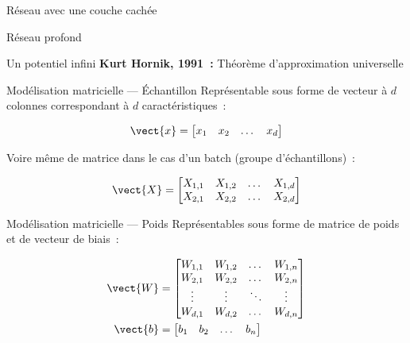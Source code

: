\begin{frame}{Réseau avec une couche cachée}
  \centering
\end{frame}

\begin{frame}{Réseau profond}
  \centering
\end{frame}

\begin{frame}{Un potentiel infini}
  \textbf{Kurt Hornik, 1991~:} Théorème d'approximation universelle
\end{frame}

\begin{frame}{Modélisation matricielle --- Échantillon}
  Représentable sous forme de vecteur à $d$ colonnes correspondant à $d$ caractéristiques~:

  \[
    \vect{x} = \begin{bmatrix}
      x_1 & x_2 & \dots & x_d
    \end{bmatrix}
  \]

  Voire même de matrice dans le cas d'un batch (groupe d'échantillons)~:

  \[
    \vect{X} = \begin{bmatrix}
      X_{1,1} & X_{1,2} & \dots & X_{1,d} \\
      X_{2,1} & X_{2,2} & \dots & X_{2,d}
    \end{bmatrix}
  \]
\end{frame}

\begin{frame}{Modélisation matricielle --- Poids}
  Représentables sous forme de matrice de poids et de vecteur de biais~:

  \begin{align*}
    \vect{W} & = \begin{bmatrix}
      W_{1,1} & W_{1,2} & \dots  & W_{1,n} \\
      W_{2,1} & W_{2,2} & \dots  & W_{2,n} \\
      \vdots & \vdots & \ddots & \vdots \\
      W_{d,1} & W_{d,2} & \dots  & W_{d,n}
    \end{bmatrix} \\
    \vect{b} & = \begin{bmatrix}
      b_1 & b_2 & \dots & b_n
    \end{bmatrix}
  \end{align*}
\end{frame}

